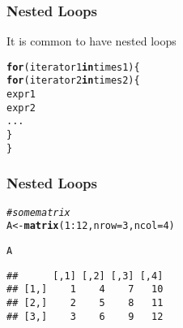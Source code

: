 \documentclass[12pt]{beamer}\usepackage[]{graphicx}\usepackage[]{color}
\makeatletter
\newcommand{\hlnum}[1]{\textcolor[rgb]{0.686,0.059,0.569}{#1}}%
\newcommand{\hlcom}[1]{\textcolor[rgb]{0.678,0.584,0.686}{\textit{#1}}}%
\newcommand{\hlopt}[1]{\textcolor[rgb]{0,0,0}{#1}}%
\newcommand{\hlstd}[1]{\textcolor[rgb]{0.345,0.345,0.345}{#1}}%
\newcommand{\hlkwa}[1]{\textcolor[rgb]{0.161,0.373,0.58}{\textbf{#1}}}%
\newcommand{\hlkwb}[1]{\textcolor[rgb]{0.69,0.353,0.396}{#1}}%
\newcommand{\hlkwc}[1]{\textcolor[rgb]{0.333,0.667,0.333}{#1}}%
\newcommand{\hlkwd}[1]{\textcolor[rgb]{0.737,0.353,0.396}{\textbf{#1}}}%
\newenvironment{kframe}{%
 \def\at@end@of@kframe{}%
 \ifinner\ifhmode%
  \def\at@end@of@kframe{\end{minipage}}%
  \begin{minipage}{\columnwidth}%
 \fi\fi%
 \def\FrameCommand##1{\hskip\@totalleftmargin \hskip-\fboxsep
 \colorbox{shadecolor}{##1}\hskip-\fboxsep
     \hskip-\linewidth \hskip-\@totalleftmargin \hskip\columnwidth}%
 \MakeFramed {\advance\hsize-\width
   \@totalleftmargin\z@ \linewidth\hsize
   \@setminipage}}%
 {\par\unskip\endMakeFramed%
 \at@end@of@kframe}
\newenvironment{knitrout}{}{} %
\makeatother
\begin{document}

\begin{frame}[fragile]
\frametitle{Nested Loops}

It is common to have nested loops
\begin{knitrout}\footnotesize
{}\color{fgcolor}\begin{kframe}
\begin{alltt}
\hlkwa{for} \hlstd{(iterator1} \hlkwa{in} \hlstd{times1) \{}
  \hlkwa{for} \hlstd{(iterator2} \hlkwa{in} \hlstd{times2) \{}
    \hlstd{expr1}
    \hlstd{expr2}
    \hlstd{...}
  \hlstd{\}}
\hlstd{\}}
\end{alltt}
\end{kframe}
\end{knitrout}

\end{frame}


\begin{frame}[fragile]
\frametitle{Nested Loops}

\begin{knitrout}\footnotesize
{}\color{fgcolor}\begin{kframe}
\begin{alltt}
\hlcom{# some matrix }
\hlstd{A} \hlkwb{<-} \hlkwd{matrix}\hlstd{(}\hlnum{1}\hlopt{:}\hlnum{12}\hlstd{,} \hlkwc{nrow} \hlstd{=} \hlnum{3}\hlstd{,} \hlkwc{ncol} \hlstd{=} \hlnum{4}\hlstd{)}

\hlstd{A}
\end{alltt}
\begin{verbatim}
##      [,1] [,2] [,3] [,4]
## [1,]    1    4    7   10
## [2,]    2    5    8   11
## [3,]    3    6    9   12
\end{verbatim}
\end{kframe}
\end{knitrout}

\end{frame}

\end{document}
